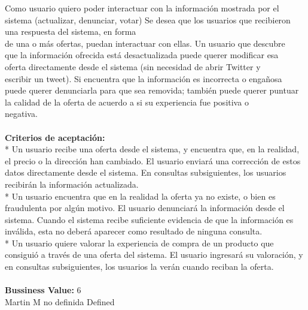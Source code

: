 	{Como usuario quiero poder interactuar con la información mostrada por el sistema (actualizar, denunciar, votar)} %
	{Se desea que los usuarios que recibieron una respuesta del sistema, en forma\\
de una o más ofertas, puedan interactuar con ellas. Un usuario que descubre\\
que la información ofrecida está desactualizada puede querer modificar esa\\
oferta directamente desde el sistema (sin necesidad de abrir Twitter y\\
escribir un tweet). Si encuentra que la información es incorrecta o engañosa\\
puede querer denunciarla para que sea removida; también puede querer puntuar\\
la calidad de la oferta de acuerdo a si su experiencia fue positiva o\\
negativa.\\
  \\
\textbf{Criterios de aceptación:}\\
* Un usuario recibe una oferta desde el sistema, y encuentra que, en la realidad, el precio o la dirección han cambiado. El usuario enviará una corrección de estos datos directamente desde el sistema. En consultas subsiguientes, los usuarios recibirán la información actualizada.  \\
* Un usuario encuentra que en la realidad la oferta ya no existe, o bien es fraudulenta por algún motivo. El usuario denunciará la información desde el sistema. Cuando el sistema recibe suficiente evidencia de que la información es inválida, esta no deberá aparecer como resultado de ninguna consulta.  \\
* Un usuario quiere valorar la experiencia de compra de un producto que consiguió a través de una oferta del sistema. El usuario ingresará su valoración, y en consultas subsiguientes, los usuarios la verán cuando reciban la oferta. \\
  \\
\textbf{Bussiness Value:} 6\\
} %
	{} %
	{} %
	{Martin M} %
	{no definida} %
	{Defined} %


\vspace{20pt}

